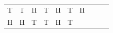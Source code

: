 {\begin{tabular}[t]{|l|l|l|l|l|l|l|l|l|l|}
        T &
        T &
        H &
        T &
        H &
        T &
        H%
     \tabularnewline\cline{1-1}\cline{2-2}\cline{3-3}\cline{4-4}\cline{5-5}\cline{6-6}\cline{7-7}\cline{8-8}\cline{9-9}\cline{10-10}
        H &
        H &
        T &
        T &
        H &
        T &

\end{tabular}}
